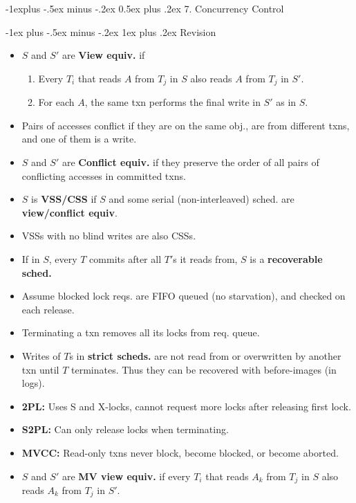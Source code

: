 \documentclass[8pt, landscape]{extarticle}
\makeatletter
\renewcommand{\subsection}{\@startsection{subsection}{2}{0mm}%
  {-1explus -.5ex minus -.2ex}%
  {0.5ex plus .2ex}%
{\normalfont\normalsize\bfseries}}
\renewcommand{\subsubsection}{\@startsection{subsubsection}{3}{0mm}%
  {-1ex plus -.5ex minus -.2ex}%
  {1ex plus .2ex}%
{\normalfont\small\bfseries}}%
\makeatother
\begin{document}
\begin{multicols*}{4}
\subsection{7. Concurrency Control}

\subsubsection{Revision}

\begin{itemize}
    \item $S$ and $S'$ are \textbf{View equiv.} if
    \begin{enumerate}
        \item Every $T_i$ that reads $A$ from $T_j$ in $S$ also reads $A$ from $T_j$ in $S'$.
        \item For each $A$, the same txn performs the final write in $S'$ as in $S$.
    \end{enumerate}
    \item Pairs of accesses conflict if they are on the same obj., are from different txns, and one of them is a write.
    \item $S$ and $S'$ are \textbf{Conflict equiv.} if they preserve the order of all pairs of conflicting accesses in committed txns.
    \item $S$ is \textbf{VSS/CSS} if $S$ and some serial (non-interleaved) sched. are \textbf{view/conflict equiv}.
    \item VSSs with no blind writes are also CSSs.
    \item If in $S$, every $T$ commits after all $T'$s it reads from, $S$ is a \textbf{recoverable sched.}
    \item Assume blocked lock reqs. are FIFO queued (no starvation), and checked on each release.
    \item Terminating a txn removes all its locks from req. queue.
    \item Writes of $T$s in \textbf{strict scheds.} are not read from or overwritten by another txn until $T$ terminates. Thus they can be recovered with before-images (in logs).
    \item \textbf{2PL:} Uses S and X-locks, cannot request more locks after releasing first lock.
    \item \textbf{S2PL:} Can only release locks when terminating.
    \item \textbf{MVCC:} Read-only txns never block, become blocked, or become aborted. 
    \item $S$ and $S'$ are \textbf{MV view equiv.} if every $T_i$ that reads $A_k$ from $T_j$ in $S$ also reads $A_k$ from $T_j$ in $S'$.

\end{itemize}
\end{multicols*}
\end{document}
